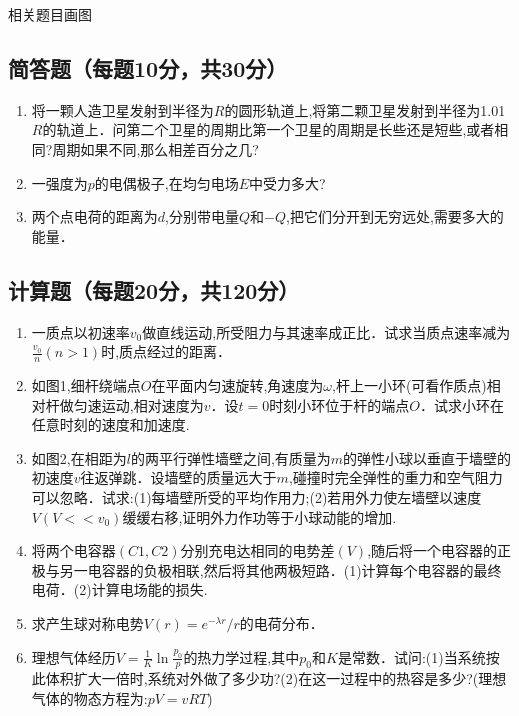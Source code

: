 
\begin{issues}
\issueTODO
相关题目画图
\end{issues}


\subsection{ 简答题（每题10分，共30分）}
\begin{enumerate}
\item 将一颗人造卫星发射到半径为$R$的圆形轨道上,将第二颗卫星发射到半径为1.01$R$的轨道上．问第二个卫星的周期比第一个卫星的周期是长些还是短些,或者相同?周期如果不同,那么相差百分之几?
\item 一强度为$p$的电偶极子,在均匀电场$E$中受力多大?
\item 两个点电荷的距离为$d$,分别带电量$Q$和$-Q$,把它们分开到无穷远处,需要多大的能量．
\end{enumerate}
\subsection{计算题（每题20分，共120分）}
\begin{enumerate}
\item 一质点以初速率$v_0$做直线运动,所受阻力与其速率成正比．试求当质点速率减为$\frac{v_0}{n}(n>1)$时,质点经过的距离．
\item 如图1,细杆绕端点$O$在平面内匀速旋转,角速度为$\omega$,杆上一小环(可看作质点)相对杆做匀速运动,相对速度为$v$．设$t=0$时刻小环位于杆的端点$O$．试求小环在任意时刻的速度和加速度.
\item 如图2,在相距为$l$的两平行弹性墙壁之间,有质量为$m$的弹性小球以垂直于墙壁的初速度$v$往返弹跳．设墙壁的质量远大于$m$,碰撞时完全弹性的重力和空气阻力可以忽略．试求:(1)每墙壁所受的平均作用力;(2)若用外力使左墙壁以速度$V(V<<v_0)$缓缓右移,证明外力作功等于小球动能的增加.
\item 将两个电容器$(C1,C2)$分别充电达相同的电势差$(V)$,随后将一个电容器的正极与另一电容器的负极相联,然后将其他两极短路．(1)计算每个电容器的最终电荷．(2)计算电场能的损失.
\item 求产生球对称电势$V(r)=e^{-\lambda r}/r$的电荷分布．
\item 理想气体经历$V=\frac{1}{K} \ln \frac{p_{0}}{p}$的热力学过程,其中$p_0$和$K$是常数．试问:(1)当系统按此体积扩大一倍时,系统对外做了多少功?(2)在这一过程中的热容是多少?(理想气体的物态方程为:$pV=vRT$)
\end{enumerate}
